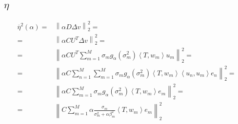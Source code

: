 \documentclass[a4paper,10pt]{article}
\theoremstyle{plain}
\theoremstyle{definition}
\theoremstyle{remark}
\newcommand{\obar}[1]{\overline{#1}}
\newcommand{\pa}[1]{\left(#1\right)}
\newcommand{\ang}[1]{\left<#1\right>}
\newcommand{\bra}[1]{\left[#1\right]}
\newcommand{\norm}[1]{\left\|#1\right\|}
\begin{document}





\newpage
\subsection{$\eta$}

\begin{align*}
  \obar{\eta}^2(\alpha ) = & \norm{ \alpha D \Delta v } _2 ^2 =  \\
  = & \norm{ \alpha C U^T \Delta v} _2 ^2 =\\
  = & \norm{ \alpha C U^T \sum _{m=1} ^M \sigma _m g_\alpha \pa{\sigma_m ^2 }
    \ang{T,w_m} u_m } _2 ^2 =\\
  = & \norm{ \alpha C \sum _{n=1} ^M \sum _{m=1} ^M \sigma _m g_\alpha
    \pa{\sigma_m ^2 }
    \ang{T,w_m} \ang{u_n,u_m} e_n } _2 ^2 =\\
  = & \norm{ \alpha C \sum _{m=1} ^M \sigma _m g_\alpha \pa{\sigma_m ^2 }
    \ang{T,w_m} e_m } _2 ^2 =\\
  = & \norm{ C \sum _{m=1} ^M \alpha \frac{\sigma _m}{ \sigma _m ^2 + \alpha
      \beta _m ^2 } \ang{T,w_m} e_m } _2 ^2 
\end{align*}
\end{document}
